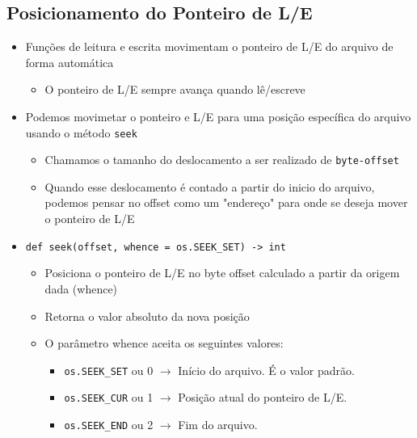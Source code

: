 \documentclass[12pt]{article}
\begin{document}
        \subsection{Posicionamento do Ponteiro de L/E}
        \begin{itemize}
            \item Funções de leitura e escrita movimentam o ponteiro de L/E do 
            arquivo de forma automática
            \begin{itemize}
                \item O ponteiro de L/E sempre avança quando lê/escreve
            \end{itemize}
            \item Podemos movimetar o ponteiro e L/E para uma posição específica 
            do arquivo usando o método \verb|seek|
            \begin{itemize}
                \item Chamamos o tamanho do deslocamento a ser realizado de 
                \verb|byte-offset|
                \item Quando esse deslocamento é contado a partir do inicio do 
                arquivo, podemos pensar no offset como um "endereço" para onde 
                se deseja mover o ponteiro de L/E
            \end{itemize}
            \item \verb|def seek(offset, whence = os.SEEK_SET) -> int|
            \begin{itemize}
                \item Posiciona o ponteiro de L/E no byte offset calculado a 
                partir da origem dada (whence)
                \item Retorna o valor absoluto da nova posição
                \item O parâmetro whence aceita os seguintes valores:
                \begin{itemize}
                    \item \verb|os.SEEK_SET| ou 0 $\rightarrow$ Início do 
                    arquivo. É o valor padrão.
                    \item \verb|os.SEEK_CUR| ou 1 $\rightarrow$ Posição atual 
                    do ponteiro de L/E.
                    \item \verb|os.SEEK_END| ou 2 $\rightarrow$ Fim do arquivo.
                \end{itemize}
            \end{itemize}

\end{itemize}
\end{document}
